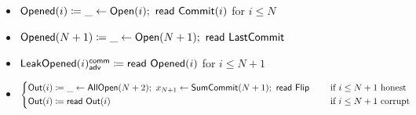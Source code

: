 \begin{itemize}
\item {\color{red} $\mathsf{Opened}(i) \coloneqq \_ \leftarrow \mathsf{Open}(i); \ \mathsf{read} \ \mathsf{Commit}(i)$ for $i \leq N$}
\item {\color{red} $\mathsf{Opened}(N+1) \coloneqq \_ \leftarrow \mathsf{Open}(N+1); \ \mathsf{read} \ \mathsf{LastCommit}$}
\item {\color{red} $\mathsf{LeakOpened}(i)^{\mathsf{comm}}_{\mathsf{adv}} \coloneqq \mathsf{read} \ \mathsf{Opened}(i)$ for $i \leq N+1$}
\item $\begin{cases*} \Out(i) \coloneqq \_ \leftarrow \AllOpen(N+2); \ x_{N+1} \leftarrow \SumCommit(N+1); \ \read{\Flip} & \hspace{10pt} \text{if $i \leq N+1$ honest} \\ \Out(i) \coloneqq \read{\Out(i)} & \hspace{10pt} \text{if $i \leq N+1$ corrupt} \end{cases*}$
\end{itemize}

